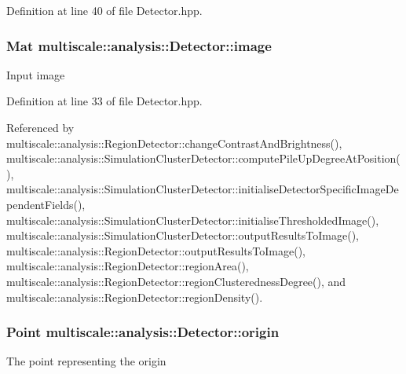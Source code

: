 Definition at line 40 of file Detector.\-hpp.

\hypertarget{classmultiscale_1_1analysis_1_1Detector_a523830a6cfe409694ce8327c3c736fbd}{
\subsubsection[{image}]{\setlength{\rightskip}{0pt plus 5cm}Mat multiscale\-::analysis\-::\-Detector\-::image\hspace{0.3cm}{\ttfamily [protected]}}}\label{classmultiscale_1_1analysis_1_1Detector_a523830a6cfe409694ce8327c3c736fbd}
Input image 

Definition at line 33 of file Detector.\-hpp.



Referenced by multiscale\-::analysis\-::\-Region\-Detector\-::change\-Contrast\-And\-Brightness(), multiscale\-::analysis\-::\-Simulation\-Cluster\-Detector\-::compute\-Pile\-Up\-Degree\-At\-Position(), multiscale\-::analysis\-::\-Simulation\-Cluster\-Detector\-::initialise\-Detector\-Specific\-Image\-Dependent\-Fields(), multiscale\-::analysis\-::\-Simulation\-Cluster\-Detector\-::initialise\-Thresholded\-Image(), multiscale\-::analysis\-::\-Simulation\-Cluster\-Detector\-::output\-Results\-To\-Image(), multiscale\-::analysis\-::\-Region\-Detector\-::output\-Results\-To\-Image(), multiscale\-::analysis\-::\-Region\-Detector\-::region\-Area(), multiscale\-::analysis\-::\-Region\-Detector\-::region\-Clusteredness\-Degree(), and multiscale\-::analysis\-::\-Region\-Detector\-::region\-Density().

\hypertarget{classmultiscale_1_1analysis_1_1Detector_a002237e2ad684975a7c8b1e12dd7d780}{
\subsubsection[{origin}]{\setlength{\rightskip}{0pt plus 5cm}Point multiscale\-::analysis\-::\-Detector\-::origin\hspace{0.3cm}{\ttfamily [protected]}}}\label{classmultiscale_1_1analysis_1_1Detector_a002237e2ad684975a7c8b1e12dd7d780}
The point representing the origin 

